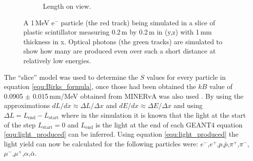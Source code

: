 \begin{figure}[!h]
\begin{subfigure}{.5\textwidth}
  \captionsetup{width=.9\linewidth}
  \caption{Length on view.}
  \label{subFig:sideOnViewSliceElectron780Square}
\end{subfigure}
\caption{A 1\,MeV e$^-$ particle (the red track) being simulated in a slice of plastic scintillator measuring 0.2\,m by 0.2\,m in (y,z) with 1\,mm thickness in x. Optical photons (the green tracks) are simulated to show how many are produced even over such a short distance at relatively low energies.}
\label{fig:lengthAndSideViewSliceElectron780Square}
\end{figure}

The ``slice'' model was used to determine the $S$ values for every particle in equation \ref{equ:Birks_formula}, once those had been obtained the $kB$ value of 0.0905 $\pm$ 0.015\,mm/MeV obtained from MINERvA was also used \cite{aliaga_2015}. By using the approximations $dL/dx \approx \Delta L / \Delta x$ and $dE/dx \approx \Delta E / \Delta x$ and using $\Delta L = L_{\textrm{end}} - L_{\textrm{start}} $ where in the simulation it is known that the light at the start of the step $L_{\textrm{start}} = 0$ and $L_{\textrm{end}}$ is the light at the end of each GEANT4 equation \ref{equ:light_produced} can be inferred. Using equation \ref{equ:light_produced} the light yield can now be calculated for the following particles were: $e^-$,$e^+$,$p$,$\bar{p}$,$\pi^+$,$\pi^-$,$\mu^-$,$\mu^+$,$\alpha$,$\bar{\alpha}$.


